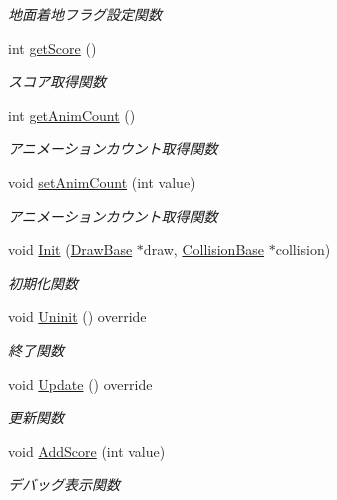 \begin{DoxyCompactItemize}
\begin{DoxyCompactList}\small\item\em 地面着地フラグ設定関数 \end{DoxyCompactList}\item 
int \mbox{\hyperlink{class_player_a97e5447778ae6c384eedc532dcd8431d}{get\+Score}} ()
\begin{DoxyCompactList}\small\item\em スコア取得関数 \end{DoxyCompactList}\item 
int \mbox{\hyperlink{class_player_ae7ab2639de2492722e9db81533598e01}{get\+Anim\+Count}} ()
\begin{DoxyCompactList}\small\item\em アニメーションカウント取得関数 \end{DoxyCompactList}\item 
void \mbox{\hyperlink{class_player_aecd3f846ad6bb9e7525ef273c4a76f53}{set\+Anim\+Count}} (int value)
\begin{DoxyCompactList}\small\item\em アニメーションカウント取得関数 \end{DoxyCompactList}\item 
void \mbox{\hyperlink{class_player_aaf3637816c8511b56528cb8f2a6d1ccb}{Init}} (\mbox{\hyperlink{class_draw_base}{Draw\+Base}} $\ast$draw, \mbox{\hyperlink{class_collision_base}{Collision\+Base}} $\ast$collision)
\begin{DoxyCompactList}\small\item\em 初期化関数 \end{DoxyCompactList}\item 
void \mbox{\hyperlink{class_player_a7455a83ac23d2f5e0cce0ddd7d92db0c}{Uninit}} () override
\begin{DoxyCompactList}\small\item\em 終了関数 \end{DoxyCompactList}\item 
void \mbox{\hyperlink{class_player_a5e17be3418fa0ac0192c05efaf3dc8bd}{Update}} () override
\begin{DoxyCompactList}\small\item\em 更新関数 \end{DoxyCompactList}\item 
void \mbox{\hyperlink{class_player_aa3adab06a1122754f468413b5d3a165f}{Add\+Score}} (int value)
\begin{DoxyCompactList}\small\item\em デバッグ表示関数 \end{DoxyCompactList}\end{DoxyCompactItemize}
